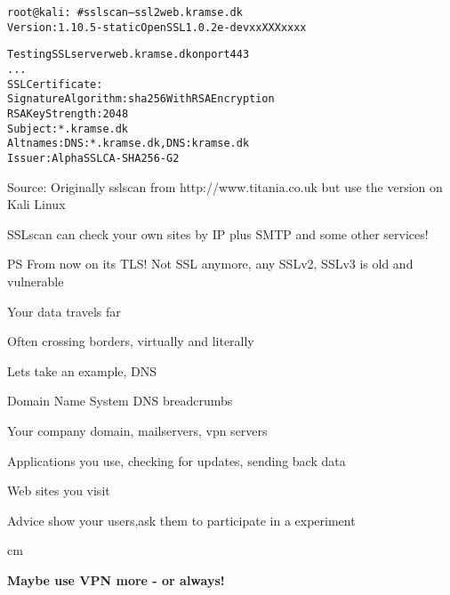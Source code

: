 \documentclass[Screen16to9,17pt]{foils}
\begin{document}

\begin{alltt}\small
root@kali:~# sslscan --ssl2 web.kramse.dk
Version: 1.10.5-static OpenSSL 1.0.2e-dev xx XXX xxxx

Testing SSL server web.kramse.dk on port 443
...
  SSL Certificate:
Signature Algorithm: sha256WithRSAEncryption
RSA Key Strength:    2048
Subject:  *.kramse.dk
Altnames: DNS:*.kramse.dk, DNS:kramse.dk
Issuer:   AlphaSSL CA - SHA256 - G2
\end{alltt}

Source:
Originally sslscan from http://www.titania.co.uk
 but use the version on Kali Linux

SSLscan can check your own sites by IP plus SMTP and some other services!

\vskip 1cm
PS From now on its TLS! Not SSL anymore, any SSLv2, SSLv3 is old and vulnerable





\begin{list2}
\item Your data travels far
\item Often crossing borders, virtually and literally
\end{list2}


\begin{list1}
\item Lets take an example, DNS
\item Domain Name System DNS breadcrumbs
\begin{list2}
\item Your company domain, mailservers, vpn servers
\item Applications you use, checking for updates, sending back data
\item Web sites you visit
\end{list2}
\vskip 1cm
\item Advice show your users,ask them to participate in a experiment
\end{list1}


 cm
\centerline{\bf\Large Maybe use VPN more - or always!}

\end{document}
